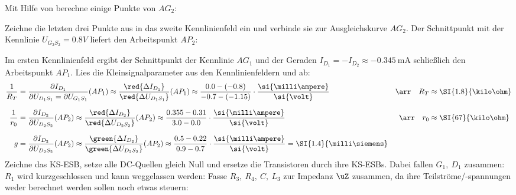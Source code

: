 \noindent Mit Hilfe von  berechne einige Punkte von $AG_2$:

%

\noindent Zeichne die letzten drei Punkte aus  in das zweite Kennlinienfeld  ein und verbinde sie zur Ausgleichskurve $AG_2$. Der Schnittpunkt mit der Kennlinie $U_{G_2S_2}=0.8V$ liefert den Arbeitspunkt $AP_2$:
%

\noindent Im ersten Kennlinienfeld  ergibt der Schnittpunkt der Kennlinie $AG_1$ und der Geraden $I_{D_1}=-I_{D_2}\approx\SI{-0.345}{\milli\ampere}$ schließlich den Arbeitspunkt $AP_1$.
%
%
%
Lies die Kleinsignalparameter aus den Kennlinienfeldern  und  ab:
\begin{align*}%
	\frac{1}{R_T}&=\frac{%
		\partial I_{D_1}%
	}{%
		\partial U_{D_1S_1}=\partial U_{G_1S_1}%
	}(AP_1)\approx\frac{%
		\red{\Delta I_{D_1}}%
	}{%
		\red{\Delta U_{D_1S_1}}%
	}(AP_1)\approx\frac{%
		0.0-(-0.8)%
	}{%
		-0.7-(-1.15)%
	}\cdot\frac{%
		\si{\milli\ampere}%
	}{%
		\si{\volt}%
	}&\arr\quad R_T&\approx\SI{1.8}{\kilo\ohm}\\[2.5mm]%
%
	\frac{1}{r_0}&=\frac{%
		\partial I_{D_2}%
	}{%
		\partial U_{D_2S_2}%
	}(AP_2)\approx\frac{%
		\red{\Delta I_{D_2}}%
	}{%
		\red{\Delta U_{D_2S_2}}%
	}(AP_2)\approx\frac{%
		0.355-0.31%
	}{%
		3.0-0.0%
	}\cdot\frac{%
		\si{\milli\ampere}%
	}{%
		\si{\volt}%
	}&\arr\quad r_0&\approx\SI{67}{\kilo\ohm}\\[2.5mm]%
%
	g&=\frac{%
		\partial I_{D_2}%
	}{%
		\partial U_{D_2S_2}%
	}(AP_2)\approx\frac{%
		\green{\Delta I_{D_2}}%
	}{%
		\green{\Delta U_{D_2S_2}}%
	}(AP_2)\approx\frac{%
		0.5-0.22%
	}{%
		0.9-0.7%
	}\cdot\frac{%
		\si{\milli\ampere}%
	}{%
		\si{\volt}%
	}=\SI{1.4}{\milli\siemens}&&%
\end{align*}%
%
%
%
Zeichne das KS-ESB, setze alle DC-Quellen gleich Null und ersetze die Transistoren durch ihre KS-ESBs. Dabei fallen $G_1,\:D_1$ zusammen: $R_1$ wird kurzgeschlossen und kann weggelassen werden:
%
%
%
%
Fasse $R_3,\:R_4,\:C,\: L_3$ zur Impedanz $\uZ$ zusammen, da ihre Teilströme/-spannungen weder berechnet werden sollen noch etwas steuern:
